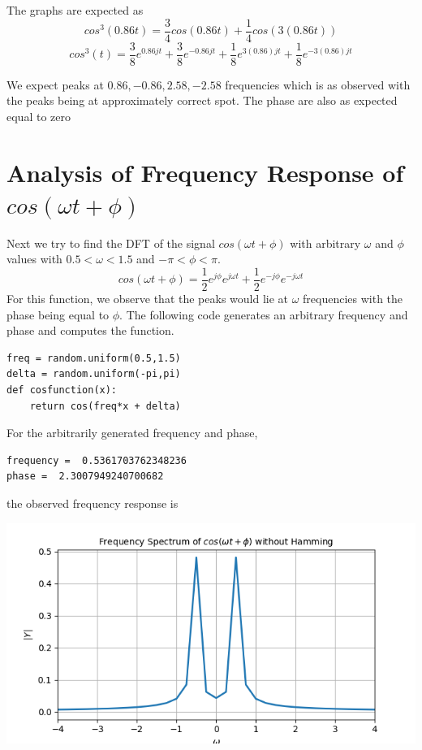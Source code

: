 \documentclass[12pt, a4paper]{report}
\begin{document}
The graphs are expected as 
\begin{equation*}
cos^3(0.86t) = \frac{3}{4}cos(0.86t) + \frac{1}{4}cos(3(0.86t))
\end{equation*}
\begin{equation*}
cos^3(t) = \frac{3}{8}e^{0.86jt} + \frac{3}{8}e^{-0.86jt} + \frac{1}{8}e^{3(0.86)jt} + \frac{1}{8}e^{-3(0.86)jt}
\end{equation*}

We expect peaks at $0.86, -0.86, 2.58, -2.58$ frequencies which is as observed with the peaks being at approximately correct spot. The phase are also as expected equal to zero

\section*{Analysis of Frequency Response of $cos(\omega t+ \phi)$}
Next we try to find the DFT of the signal $cos(\omega t+ \phi)$ with arbitrary $\omega$ and $\phi$ values with $0.5 < \omega < 1.5$ and $-\pi < \phi < \pi$. 
\begin{equation*}
cos(\omega t+ \phi) = \frac{1}{2}e^{j \phi}e^{j \omega t} + \frac{1}{2}e^{-j \phi}e^{-j \omega t}
\end{equation*}
For this function, we observe that the peaks would lie at $\omega$ frequencies with the phase being equal to $\phi$. The following code generates an arbitrary frequency and phase and computes the function.

\begin{verbatim}
freq = random.uniform(0.5,1.5)
delta = random.uniform(-pi,pi)
def cosfunction(x):
    return cos(freq*x + delta)
\end{verbatim}

For the arbitrarily generated frequency and phase,
\begin{verbatim}
frequency =  0.5361703762348236
phase =  2.3007949240700682
\end{verbatim}

the observed frequency response is  
\begin{center}
	\includegraphics[scale=0.75]{Figure_14.png} 
	\label{fig:rawdata}
\end{center}
\clearpage
\end{document}
